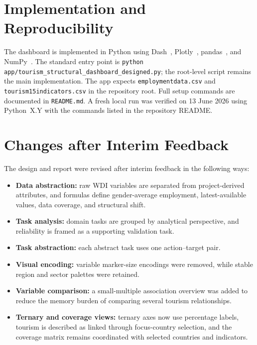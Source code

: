 \documentclass{vgtc}
\begin{document}
\section{Implementation and Reproducibility}

The dashboard is implemented in Python using Dash~\cite{dash}, Plotly~\cite{plotly}, pandas~\cite{pandas}, and NumPy~\cite{numpy}. The standard entry point is \texttt{python app/tourism\_structural\_dashboard\_designed.py}; the root-level script remains the main implementation. The app expects \texttt{employmentdata.csv} and \texttt{tourism15indicators.csv} in the repository root. Full setup commands are documented in \texttt{README.md}. A fresh local run was verified on 13 June 2026 using Python~X.Y with the commands listed in the repository README.


\section{Changes after Interim Feedback}

The design and report were revised after interim feedback in the following ways:

\begin{itemize}
    \setlength\itemsep{0pt}
    \item \textbf{Data abstraction:} raw WDI variables are separated from project-derived attributes, and formulas define gender-average employment, latest-available values, data coverage, and structural shift.
    \item \textbf{Task analysis:} domain tasks are grouped by analytical perspective, and reliability is framed as a supporting validation task.
    \item \textbf{Task abstraction:} each abstract task uses one action--target pair.
    \item \textbf{Visual encoding:} variable marker-size encodings were removed, while stable region and sector palettes were retained.
    \item \textbf{Variable comparison:} a small-multiple association overview was added to reduce the memory burden of comparing several tourism relationships.
    \item \textbf{Ternary and coverage views:} ternary axes now use percentage labels, tourism is described as linked through focus-country selection, and the coverage matrix remains coordinated with selected countries and indicators.
\end{itemize}
\end{document}
